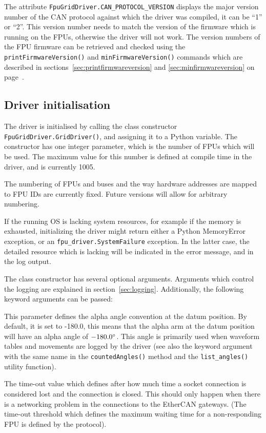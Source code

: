 \documentclass[11pt,a4paper]{scrartcl}
\begin{document}
The attribute \texttt{FpuGridDriver.CAN\_PROTOCOL\_VERSION} displays
the major version number of the CAN protocol against which the driver
was compiled, it can be ``1'' or ``2''. This version number needs to
match the version of the firmware which is running on the FPUs,
otherwise the driver will not work. The version numbers of the FPU
firmware can be retrieved and checked using the
\texttt{printFirmwareVersion()} and \texttt{minFirmwareVersion()}
commands which are described in
sections~\ref{sec:printfirmwareversion} and
\ref{sec:minfirmwareversion} on
page~\pageref{sec:printfirmwareversion}.


\subsection{Driver initialisation}
The driver is initialised by calling the class constructor
\texttt{FpuGridDriver.GridDriver()}, and assigning it to a Python
variable. The constructor has one integer parameter, which is the
number of FPUs which will be used. The maximum value for this number
is defined at compile time in the driver, and is currently 1005.

The numbering of FPUs and buses and the way hardware addresses are
mapped to FPU IDs are currently fixed. Future versions will allow for
arbitrary numbering.

\begin{sloppypar}
If the running OS is lacking system resources, for example if the
memory is exhausted, initializing the driver might return either a
Python MemoryError exception, or an
\texttt{fpu\_driver.SystemFailure} exception. In the latter case,
the detailed resource which is lacking will be indicated in the error
message, and in the log output.
\end{sloppypar}

\label{sec:driverparams}
The class constructor has several optional arguments. Arguments which
control the logging are explained in section~\ref{sec:logging}.
Additionally, the following keyword arguments can
be passed:

\begin{description}
\item[\texttt{alpha\_datum\_offset}] This parameter defines the alpha
  angle convention at the datum position. By default, it is set to
  -180.0, this means that the alpha arm at the datum position will
  have an alpha angle of $-180.0\degree$. This angle is primarily used
  when waveform tables and movements are logged by the driver (see
  also the keyword argument with the same name in the
  \texttt{countedAngles()} method and the \texttt{list\_angles()}
  utility function).

\item[\texttt{SocketTimeOutSeconds}] The time-out value which defines
  after how much time a socket connection is considered lost and the
  connection is closed. This should only happen when there is a
  networking problem in the connections to the EtherCAN gateways.
  (The time-out threshold which defines the maximum waiting time for a
  non-responding FPU is defined by the protocol).
\end{description}
\end{document}
